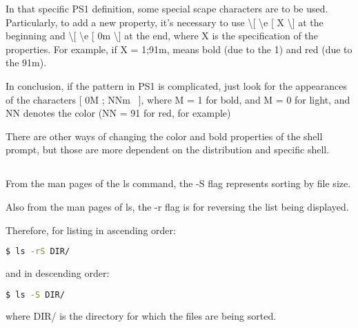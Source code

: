 \documentclass[paper=a4, fontsize=11pt]{scrartcl} %
\numberwithin{equation}{section} %
\numberwithin{figure}{section} %
\numberwithin{table}{section} %
\begin{document}
\begin{onehalfspacing}
In that specific PS1 definition, some special scape characters are to be used. Particularly, to add a new property, it's necessary to use \textbackslash [ \textbackslash e [ X \textbackslash ] at the beginning and \textbackslash [ \textbackslash e [ 0m \textbackslash ] at the end, where X is the specification of the properties. For example, if X = 1;91m, means bold (due to the 1) and red (due to the 91m).

In conclusion, if the pattern in PS1 is complicated, just look for the appearances of the characters [ 0M ; NNm \ ], where M = 1 for bold, and M = 0 for light, and NN denotes the color (NN = 91 for red, for example)

There are other ways of changing the color and bold properties of the shell prompt, but those are more dependent on the distribution and specific shell.

\begin{comment}

\begin{lstlisting}[language=bash]
  $ wget http://tex.stackexchange.com
\end{lstlisting}

\subsection{\textbf{}}
\end{comment}


\subsection{\textbf{}}

From the man pages of the ls command, the -S flag represents sorting by file size.

Also from the man pages of ls, the -r flag is for reversing the list being displayed.

Therefore, for listing in ascending order:

\begin{lstlisting}[language=bash]
  $ ls -rS DIR/
\end{lstlisting}

and in descending order:

\begin{lstlisting}[language=bash]
  $ ls -S DIR/
\end{lstlisting}

where DIR/ is the directory for which the files are being sorted.


\end{onehalfspacing}
\end{document}
